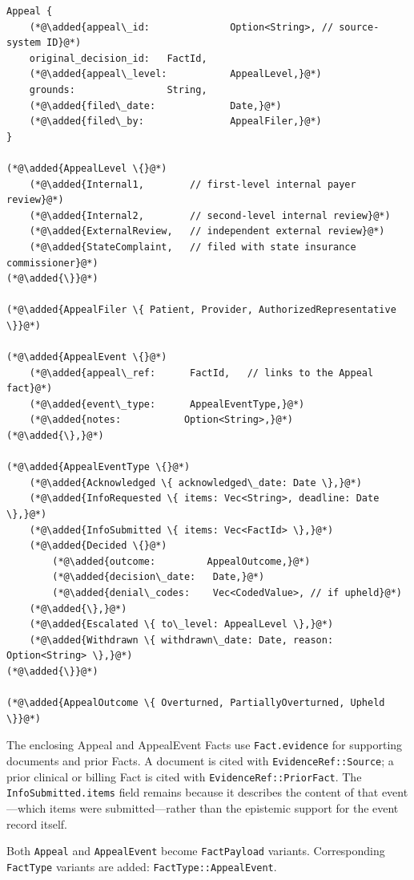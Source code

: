\documentclass[11pt]{article}
\newcommand{\added}[1]{\textcolor{accentblue}{#1}}
\begin{document}
\begin{lstlisting}
Appeal {
    (*@\added{appeal\_id:              Option<String>, // source-system ID}@*)
    original_decision_id:   FactId,
    (*@\added{appeal\_level:           AppealLevel,}@*)
    grounds:                String,
    (*@\added{filed\_date:             Date,}@*)
    (*@\added{filed\_by:               AppealFiler,}@*)
}

(*@\added{AppealLevel \{}@*)
    (*@\added{Internal1,        // first-level internal payer review}@*)
    (*@\added{Internal2,        // second-level internal review}@*)
    (*@\added{ExternalReview,   // independent external review}@*)
    (*@\added{StateComplaint,   // filed with state insurance commissioner}@*)
(*@\added{\}}@*)

(*@\added{AppealFiler \{ Patient, Provider, AuthorizedRepresentative \}}@*)

(*@\added{AppealEvent \{}@*)
    (*@\added{appeal\_ref:      FactId,   // links to the Appeal fact}@*)
    (*@\added{event\_type:      AppealEventType,}@*)
    (*@\added{notes:           Option<String>,}@*)
(*@\added{\},}@*)

(*@\added{AppealEventType \{}@*)
    (*@\added{Acknowledged \{ acknowledged\_date: Date \},}@*)
    (*@\added{InfoRequested \{ items: Vec<String>, deadline: Date \},}@*)
    (*@\added{InfoSubmitted \{ items: Vec<FactId> \},}@*)
    (*@\added{Decided \{}@*)
        (*@\added{outcome:         AppealOutcome,}@*)
        (*@\added{decision\_date:   Date,}@*)
        (*@\added{denial\_codes:    Vec<CodedValue>, // if upheld}@*)
    (*@\added{\},}@*)
    (*@\added{Escalated \{ to\_level: AppealLevel \},}@*)
    (*@\added{Withdrawn \{ withdrawn\_date: Date, reason: Option<String> \},}@*)
(*@\added{\}}@*)

(*@\added{AppealOutcome \{ Overturned, PartiallyOverturned, Upheld \}}@*)
\end{lstlisting}

The enclosing Appeal and AppealEvent Facts use \texttt{Fact.evidence} for
supporting documents and prior Facts. A document is cited with
\texttt{EvidenceRef::Source}; a prior clinical or billing Fact is cited with
\texttt{EvidenceRef::PriorFact}. The \texttt{InfoSubmitted.items} field
remains because it describes the content of that event---which items were
submitted---rather than the epistemic support for the event record itself.

Both \texttt{Appeal} and \texttt{AppealEvent} become \texttt{FactPayload}
variants. Corresponding \texttt{FactType} variants are added:
\texttt{FactType::AppealEvent}.
\end{document}
